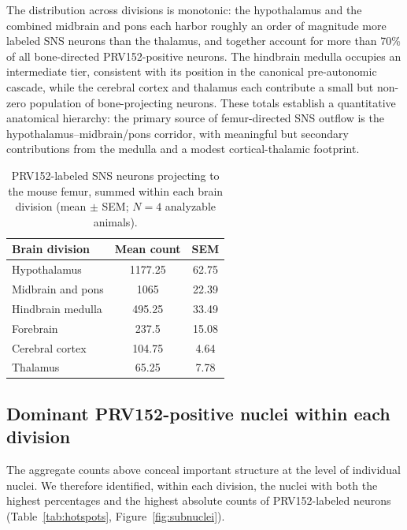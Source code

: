 \documentclass[11pt]{article}
\begin{document}
The distribution across divisions is monotonic: the hypothalamus and the combined midbrain and pons each harbor roughly an order of magnitude more labeled SNS neurons than the thalamus, and together account for more than 70\% of all bone-directed PRV152-positive neurons. The hindbrain medulla occupies an intermediate tier, consistent with its position in the canonical pre-autonomic cascade, while the cerebral cortex and thalamus each contribute a small but non-zero population of bone-projecting neurons. These totals establish a quantitative anatomical hierarchy: the primary source of femur-directed SNS outflow is the hypothalamus--midbrain/pons corridor, with meaningful but secondary contributions from the medulla and a modest cortical-thalamic footprint.

\begin{table}[htbp]
\centering
\caption{PRV152-labeled SNS neurons projecting to the mouse femur, summed within each brain division (mean $\pm$ SEM; $N=4$ analyzable animals).}
\label{tab:counts}
\begin{tabular}{lcc}
\toprule
Brain division & Mean count & SEM \\
\midrule
Hypothalamus & 1177.25 & 62.75 \\
Midbrain and pons & 1065 & 22.39 \\
Hindbrain medulla & 495.25 & 33.49 \\
Forebrain & 237.5 & 15.08 \\
Cerebral cortex & 104.75 & 4.64 \\
Thalamus & 65.25 & 7.78 \\
\bottomrule
\end{tabular}
\end{table}

\subsection{Dominant PRV152-positive nuclei within each division}

The aggregate counts above conceal important structure at the level of individual nuclei. We therefore identified, within each division, the nuclei with both the highest percentages and the highest absolute counts of PRV152-labeled neurons (Table~\ref{tab:hotspots}, Figure~\ref{fig:subnuclei}).
\end{document}
